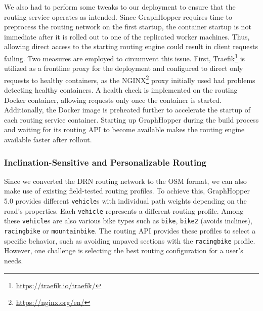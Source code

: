 We also had to perform some tweaks to our deployment to ensure that the routing service operates as intended. Since GraphHopper requires time to preprocess the routing network on the first startup, the container startup is not immediate after it is rolled out to one of the replicated worker machines. Thus, allowing direct access to the starting routing engine could result in client requests failing. Two measures are employed to circumvent this issue. First, Traefik\footnote{\url{https://traefik.io/traefik/}} is utilized as a frontline proxy for the deployment and configured to direct only requests to healthy containers, as the NGINX\footnote{\url{https://nginx.org/en/}} proxy initially used had problems detecting healthy containers. A health check is implemented on the routing Docker container, allowing requests only once the container is started. Additionally, the Docker image is preheated further to accelerate the startup of each routing service container. Starting up GraphHopper during the build process and waiting for its routing API to become available makes the routing engine available faster after rollout.

\subsubsection{Inclination-Sensitive and Personalizable Routing}

Since we converted the DRN routing network to the OSM format, we can also make use of existing field-tested routing profiles. To achieve this, GraphHopper 5.0 provides different \texttt{vehicle}s with individual path weights depending on the road's properties. Each \texttt{vehicle} represents a different routing profile. Among these \texttt{vehicle}s are also various bike types such as \texttt{bike}, \texttt{bike2} (avoids inclines), \texttt{racingbike} or \texttt{mountainbike}. The routing API provides these profiles to select a specific behavior, such as avoiding unpaved sections with the \texttt{racingbike} profile. However, one challenge is selecting the best routing configuration for a user's needs.

